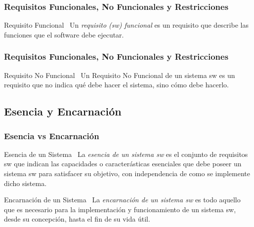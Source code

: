 \documentclass[a4paper,slidestop,xcolor=pst,dvips,blue]{beamer}
\begin{document}
\begin{frame}
    \frametitle{Requisitos Funcionales, No Funcionales y Restricciones}
    \begin{block}{Requisito Funcional~\cite{ieee:swebok}}
        Un \alert{\emph{requisito (sw) funcional}} es un requisito que describe las funciones que el software debe ejecutar.
    \end{block}
\end{frame}

\begin{frame}
    \frametitle{Requisitos Funcionales, No Funcionales y Restricciones}
    \begin{block}{Requisito No Funcional~\cite{chung:1999}}
        Un \alert{Requisito No Funcional} de un sistema sw es un requisito que no indica qué debe hacer el sistema, sino cómo debe hacerlo.
    \end{block}
\end{frame}

\subsection{Esencia y Encarnación}

\begin{frame}
    \frametitle{Esencia vs Encarnación}
    \begin{block}{Esencia de un Sistema~\cite{mcmenamin:1984}}
        La \alert{\emph{esencia de un sistema sw}} es el conjunto de requisitos sw que indican las capacidades o caracterásticas esenciales  que debe poseer un sistema sw para satisfacer su objetivo, con independencia de como se implemente dicho sistema.
    \end{block}
     {
        \begin{block}{Encarnación de un Sistema~\cite{mcmenamin:1984}}
            La \alert{\emph{encarnación de un sistema sw}} es todo aquello que es necesario para la implementación y funcionamiento de un sistema sw, desde su concepción, hasta el fin de su vida útil.
        \end{block}
    }
\end{frame}
\end{document}
